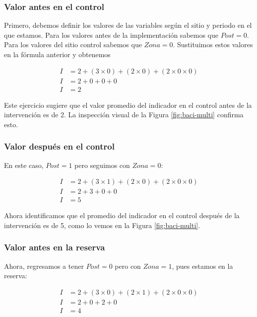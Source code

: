 \documentclass[]{krantz}
\begin{document}
\hypertarget{valor-antes-en-el-control}{%
\subsubsection{Valor antes en el control}\label{valor-antes-en-el-control}}

Primero, debemos definir los valores de las variables según el sitio y periodo en el que estamos. Para los valores antes de la implementación sabemos que \(Post = 0\). Para los valores del sitio control sabemos que \(Zona = 0\). Sustituimos estos valores en la fórmula anterior y obtenemos

\[
\begin{split}
I &= 2 + (3 \times 0) + (2\times 0) + (2 \times 0 \times 0) \\
I &= 2 + 0 + 0 + 0 \\
I &= 2
\end{split}
\]

Este ejercicio sugiere que el valor promedio del indicador en el control antes de la intervención es de 2. La inspección visual de la Figura \ref{fig:baci-multi} confirma esto.

\hypertarget{valor-despues-en-el-control}{%
\subsubsection{Valor después en el control}\label{valor-despues-en-el-control}}

En este caso, \(Post = 1\) pero seguimos con \(Zona = 0\):

\[
\begin{split}
I &= 2 + (3 \times 1) + (2\times 0) + (2 \times 0 \times 0) \\
I &= 2 + 3 + 0 + 0 \\
I &= 5
\end{split}
\]

Ahora identificamos que el promedio del indicador en el control después de la intervención es de 5, como lo vemos en la Figura \ref{fig:baci-multi}.

\hypertarget{valor-antes-en-la-reserva}{%
\subsubsection{Valor antes en la reserva}\label{valor-antes-en-la-reserva}}

Ahora, regresamos a tener \(Post = 0\) pero con \(Zona = 1\), pues estamos en la reserva:

\[
\begin{split}
I &= 2 + (3 \times 0) + (2\times 1) + (2 \times 0 \times 0) \\
I &= 2 + 0 + 2 + 0 \\
I &= 4
\end{split}
\]
\end{document}
